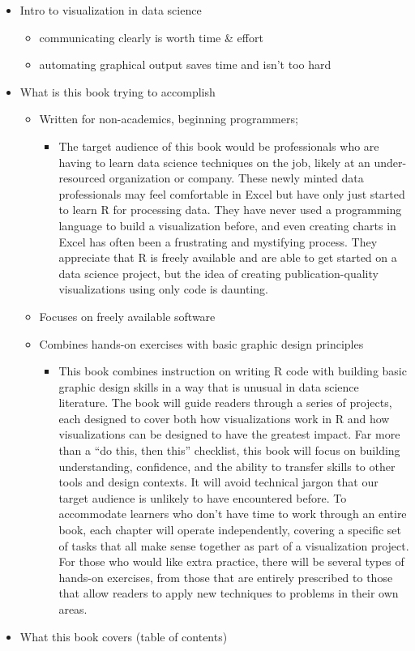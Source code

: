 \documentclass[
]{krantz}
\providecommand{\tightlist}{%
  \setlength{\itemsep}{0pt}\setlength{\parskip}{0pt}}
\begin{document}
\begin{itemize}
\tightlist
\item
  Intro to visualization in data science

  \begin{itemize}
  \tightlist
  \item
    communicating clearly is worth time \& effort
  \item
    automating graphical output saves time and isn't too hard
  \end{itemize}
\item
  What is this book trying to accomplish

  \begin{itemize}
  \tightlist
  \item
    Written for non-academics, beginning programmers;

    \begin{itemize}
    \tightlist
    \item
      The target audience of this book would be professionals who are having to learn data science techniques on the job, likely at an under-resourced organization or company. These newly minted data professionals may feel comfortable in Excel but have only just started to learn R for processing data. They have never used a programming language to build a visualization before, and even creating charts in Excel has often been a frustrating and mystifying process. They appreciate that R is freely available and are able to get started on a data science project, but the idea of creating publication-quality visualizations using only code is daunting.
    \end{itemize}
  \item
    Focuses on freely available software
  \item
    Combines hands-on exercises with basic graphic design principles

    \begin{itemize}
    \tightlist
    \item
      This book combines instruction on writing R code with building basic graphic design skills in a way that is unusual in data science literature. The book will guide readers through a series of projects, each designed to cover both how visualizations work in R and how visualizations can be designed to have the greatest impact. Far more than a ``do this, then this'' checklist, this book will focus on building understanding, confidence, and the ability to transfer skills to other tools and design contexts. It will avoid technical jargon that our target audience is unlikely to have encountered before. To accommodate learners who don't have time to work through an entire book, each chapter will operate independently, covering a specific set of tasks that all make sense together as part of a visualization project. For those who would like extra practice, there will be several types of hands-on exercises, from those that are entirely prescribed to those that allow readers to apply new techniques to problems in their own areas.
    \end{itemize}
  \end{itemize}
\item
  What this book covers (table of contents)


\end{itemize}
\end{document}
